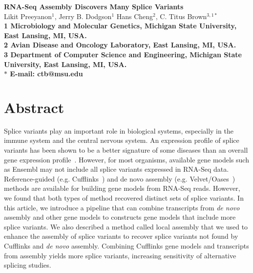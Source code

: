 \documentclass[10pt]{article}
\date{}
\begin{document}
\begin{flushleft}
{\Large
\textbf{RNA-Seq Assembly Discovers Many Splice Variants}
}
\\
Likit Preeyanon$^{1}$, 
Jerry B. Dodgson$^{1}$
Hans Cheng$^{2}$, 
C. Titus Brown$^{3,1 \ast}$
\\
\bf{1} Microbiology and Molecular Genetics, Michigan State University, East Lansing, MI, USA.
\\
\bf{2} Avian Disease and Oncology Laboratory, East Lansing, MI, USA.
\\

\bf{3} Department of Computer Science and Engineering, Michigan State University, East Lansing, MI, USA.
\\
$\ast$ E-mail: ctb@msu.edu
\end{flushleft}

\section*{Abstract}
Splice variants play an important role in biological systems, especially in the
immune system and the central nervous system. An expression profile of splice
variants has been shown to be a better signature of some diseases than an
overall gene expression profile~\cite{zhang2013isoform}. However, for most
organisms, available gene models such as Ensembl may not include all splice
variants expressed in RNA-Seq data. Reference-guided (e.g.
Cufflinks~\cite{Trapnell:2010kd}) and de novo assembly (e.g.
Velvet/Oases~\cite{Schulz:2012je}) methods are available for building gene
models from RNA-Seq reads. However, we found that both types of method recovered
distinct sets of splice variants.  In this article, we introduce a pipeline that
can combine transcripts from {\em de novo} assembly and other gene models to
constructs gene models that include more splice variants. We also described a
method called local assembly that we used to enhance the assembly of splice
variants to recover splice variants not found by Cufflinks and {\em de novo}
assembly.  Combining Cufflinks gene models and transcripts from assembly
yields more splice variants, increasing sensitivity of alternative splicing
studies.
\end{document}
